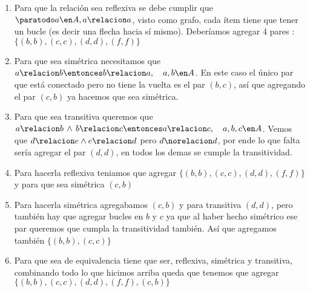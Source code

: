 \begin{enumerate}[label=\roman*)]
  \item Para que la relación sea reflexiva se debe cumplir que $\paratodo a \en A, a \relacion a$, visto como grafo,
        cada ítem tiene que tener un bucle (es decir una flecha hacia sí mismo). Deberíamos agregar 4 pares : $\{(b,b),(c,c),(d,d),(f,f)\}$

  \item Para que sea simétrica necesitamos que $a \relacion b \entonces b \relacion a, \quad a,b \en A$. En este caso el único par que está
        conectado pero no tiene la vuelta es el par $(b,c)$, así que agregando el par $(c,b)$ ya hacemos que sea simétrica.

  \item Para que sea transitiva queremos que $a \relacion b \, \land \, b \relacion c \entonces a \relacion c, \quad a,b,c \en A$. Vemos que
        $d \relacion e \land e \relacion d$ pero $d \norelacion d$, por ende lo que falta sería agregar el par $(d,d)$, en todos los
        demas se cumple la transitividad.

  \item Para hacerla reflexiva teniamos que agregar $\{(b,b),(c,c),(d,d),(f,f)\}$ y para que sea simétrica $(c,b)$

  \item Para hacerla simétrica agregabamos $(c,b)$ y para transitiva $(d,d)$, pero también hay que agregar bucles en $b$ y $c$ ya que al haber
        hecho simétrico ese par queremos que cumpla la transitividad también. Así que agregamos también $\{(b,b),(c,c)\}$

  \item Para que sea de equivalencia tiene que ser, reflexiva, simétrica y transitiva, combinando todo lo que hicimos arriba queda
        que tenemos que agregar $\{(b,b),(c,c),(d,d),(f,f),(c,b)\}$
\end{enumerate}

\begin{aportes}
  \item {}
\end{aportes}
